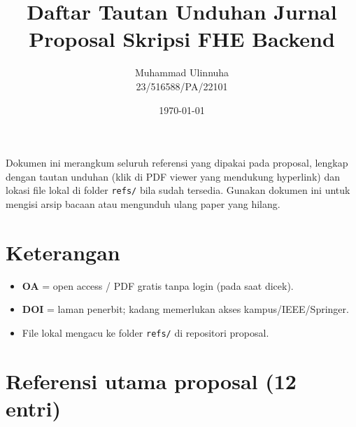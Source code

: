\documentclass[11pt,a4paper]{article}
\title{Daftar Tautan Unduhan Jurnal\\Proposal Skripsi FHE Backend}
\author{Muhammad Ulinnuha\\23/516588/PA/22101}
\date{\today}
\begin{document}
\maketitle

\noindent
Dokumen ini merangkum seluruh referensi yang dipakai pada proposal, lengkap dengan tautan unduhan (klik di PDF viewer yang mendukung hyperlink) dan lokasi file lokal di folder \texttt{refs/} bila sudah tersedia. Gunakan dokumen ini untuk mengisi arsip bacaan atau mengunduh ulang paper yang hilang.

\section*{Keterangan}
\begin{itemize}[leftmargin=1.2em]
  \item \textbf{OA} = open access / PDF gratis tanpa login (pada saat dicek).
  \item \textbf{DOI} = laman penerbit; kadang memerlukan akses kampus/IEEE/Springer.
  \item File lokal mengacu ke folder \texttt{refs/} di repositori proposal.
\end{itemize}

\section{Referensi utama proposal (12 entri)}
\end{document}
